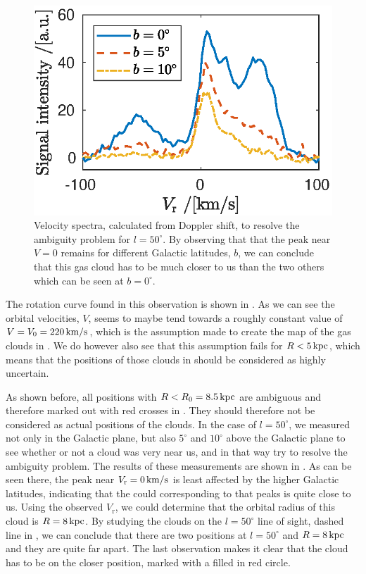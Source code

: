 \documentclass[11pt,a4paper, twocolumn,
swedish, english %
]{article}
\newcommand{\rr}{\mathrm{r}}
\begin{document}
\begin{figure}\centering
\includegraphics[width=1\linewidth]{ambiguity.eps}
\caption{Velocity spectra, calculated from Doppler shift, to resolve
  the ambiguity problem for $l=50^\circ$. By observing that that the
  peak near $V=0$ remains for different Galactic latitudes, $b$, we
  can conclude that this gas cloud has to be much closer to us than
  the two others which can be seen at $b=0^\circ$. }
\label{fig:ambiguity}
\end{figure}

The rotation curve found in this observation is shown in
. As we can see the orbital velocities, $V$, seems to
maybe tend towards a roughly constant value of
$V=V_0=\unit[220]{km/s}$, which is the assumption made to create the
map of the gas clouds in . We do however also see
that this  assumption fails for $R<\unit[5]{kpc}$, which means that
the positions of those clouds in  should be
considered as highly uncertain.

As shown before, all positions with $R<R_0=\unit[8.5]{kpc}$ are
ambiguous and therefore marked out with red crosses in
. They should therefore not be considered as actual
positions of the clouds. In the case of $l=50^\circ$, we measured not
only in the Galactic plane, but also $5^\circ$ and $10^\circ$ above the
Galactic plane to see whether or not a cloud was very near us, and in
that way try to resolve the ambiguity problem. The results of these
measurements are shown in . As can be seen there,
the peak near $V_\rr=\unit[0]{km/s}$ is least affected by the higher
Galactic latitudes, indicating that the could corresponding to that
peaks is quite close to us. Using the observed $V_\rr$, we could
determine that the orbital radius of this cloud is
$R=\unit[8]{kpc}$. By studying the clouds on the $l=50^\circ$ line of
sight, dashed line in , we can conclude that there
are two positions at $l=50^\circ$ and $R=\unit[8]{kpc}$ and they are
quite far apart. The last observation makes it clear that the cloud
has to be on the closer position, marked with a filled in red circle.
\end{document}
